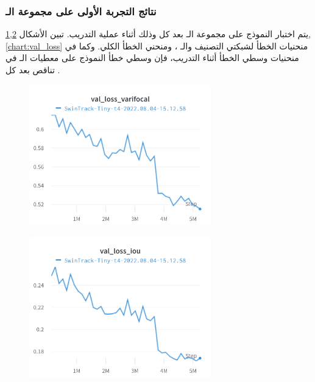 \subsubsection{ نتائج التجربة الأولى على مجموعة الـ
}
يتم اختبار النموذج على مجموعة الـ
بعد كل 
وذلك أثناء عملية التدريب.
تبين الأشكال
\ref{chart:val_loss_varifocal},\ref{chart:val_loss_iou},\ref{chart:val_loss}
منحنيات الخطأ لشبكتي التصنيف والـ
،
ومنحني الخطأ الكلي.
وكما في منحنيات وسطي الخطأ أثناء التدريب، فإن وسطي خطأ النموذج على معطيات الـ
في تناقص بعد كل 
.
\begin{figure}[H]
	\centerline{\includegraphics[width=0.7\textwidth]{charts/Section-2-Panel-1-5x2brafi7}}
	\caption{
	}
	\label{chart:val_loss_varifocal}
\end{figure}

\begin{figure}[H]
	\centerline{\includegraphics[width=0.7\textwidth]{charts/Section-2-Panel-2-owiohngs7}}
	\caption{
	}
	\label{chart:val_loss_iou}
\end{figure}

